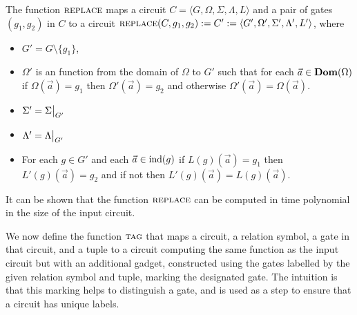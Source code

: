 \documentclass[../paper.tex]{subfiles}
\begin{document}
\begin{definition}
  The function ${\normalfont\textsc{replace}}$ maps a circuit $C = \langle G, \Omega, \Sigma,
  \Lambda, L\rangle$ and a pair of gates $(g_1, g_2)$ in $C$ to a circuit
  ${\normalfont\textsc{replace}}(C, g_1, g_2) := C' := \langle G', \Omega', \Sigma', \Lambda', L'
  \rangle$, where
  \begin{itemize}
    \setlength\itemsep{0mm}
  \item $G' = G \setminus \{g_1\}$,
  \item $\Omega'$ is an function from the domain of $\Omega$ to $G'$ such that
    for each $\vec{a} \in \text{\textbf{Dom}}(\Omega)$ if $\Omega(\vec{a}) = g_1$ then
    $\Omega'(\vec{a}) = g_2$ and otherwise $\Omega'(\vec{a}) = \Omega(\vec{a})$.
  \item $\Sigma' = \restr{\Sigma}{G'}$
  \item $\Lambda' = \restr{\Lambda}{G'}$
  \item For each $g \in G'$ and each $\vec{a} \in \text{\upshape ind}(g)$ if $L(g)(\vec{a}) =
    g_1$ then $L'(g)(\vec{a}) = g_2$ and if not then $L'(g)(\vec{a}) =
    L(g)(\vec{a})$.
  \end{itemize}
\end{definition}

It can be shown that the function ${\normalfont\textsc{replace}}$ can be computed in time
polynomial in the size of the input circuit.

We now define the function ${\normalfont\textsc{tag}}$ that maps a circuit, a relation symbol, a
gate in that circuit, and a tuple to a circuit computing the same function as
the input circuit but with an additional gadget, constructed using the gates
labelled by the given relation symbol and tuple, marking the designated gate.
The intuition is that this marking helps to distinguish a gate, and is used as a
step to ensure that a circuit has unique labels.
\end{document}
